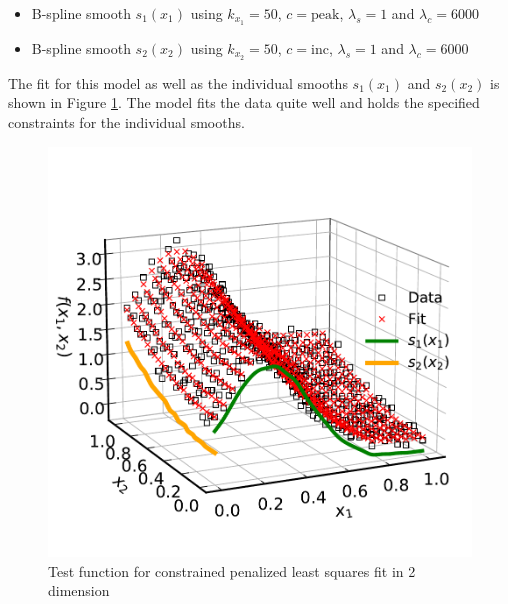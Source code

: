 \documentclass[10pt,a4paper]{article}
\begin{document}
	\begin{itemize}
		\item B-spline smooth $s_1(x_1)$ using $k_{x_1} = 50$, $c = \text{peak}$, $\lambda_s = 1$ and $\lambda_c = 6000$
		\item B-spline smooth $s_2(x_2)$ using $k_{x_2} = 50$, $c = \text{inc}$, $\lambda_s = 1$ and $\lambda_c = 6000$
	\end{itemize}
		
	The fit for this model as well as the individual smooths $s_1(x_1)$ and $s_2(x_2)$ is shown in Figure \ref{fig:2d_example}. The model fits the data quite well and holds the specified constraints for the individual smooths.
		
	\begin{figure}[H]
	\centering
	\includegraphics[width=\linewidth]{../thesisplots/2d_example.pdf}
	\caption{Test function for constrained penalized least squares fit in 2 dimension}
	\label{fig:2d_example}
	\end{figure}


	
\printbibliography
	
\end{document}
